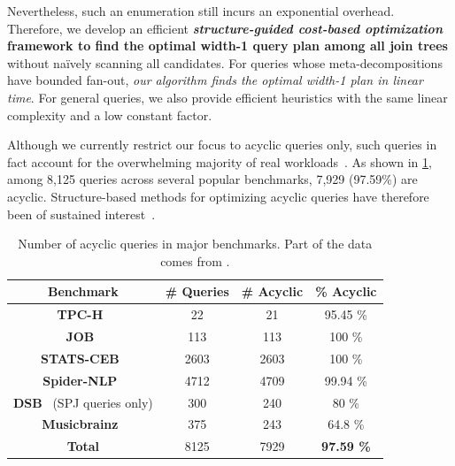 Nevertheless, such an enumeration still incurs an exponential overhead. Therefore, we develop an efficient \textbf{\emph{structure-guided cost-based optimization} framework to find the optimal width-1 query plan among all join trees} without na\"ively scanning all candidates. For queries whose meta-decompositions have bounded fan-out, \emph{our algorithm finds the optimal width-1 plan in linear time}. For general queries, we also provide efficient heuristics with the same linear complexity and a low constant factor.

Although we currently restrict our focus to acyclic queries only, such queries in fact account for the overwhelming majority of real workloads~\cite{DBLP:journals/vldb/BonifatiMT20,luo_algorithms_2025}. As shown in \cref{tab:acyclic-in-benchmarks}, among 8,125 queries across several popular benchmarks, 7,929 (97.59\%) are acyclic. Structure-based methods for optimizing acyclic queries have therefore been of sustained interest~\cite{yannakakis_algorithms_1981,wang_yannakakis_2025,RPT2025,yang_predicate_2024,bekkers2024instance,wang2023relational,SIGMOD22,DiamondJoin2024, SIGMOD23, luo_algorithms_2025}.
\begin{table}
    \small
    \centering
    \begin{footnotesize}
    \begin{tabular}{c|c|c|c}
        \hline
        {\bf Benchmark} & {\bf \# Queries} & {\bf \# Acyclic} & {\bf \% Acyclic} \\ \hline
        {\bf TPC-H}~\cite{noauthor_tpc_2022}              & 22         & 21 & 95.45 \%       \\ \hline
        {\bf JOB}~\cite{leis_query_2018} & 113 & 113 & 100 \% \\ \hline
        {\bf STATS-CEB}~\cite{han_cardinality_2021} & 2603 & 2603 & 100 \% \\ \hline
        {\bf Spider-NLP}~\cite{yu_spider_2018} & 4712 & 4709 & 99.94 \% \\ \hline
        {\bf DSB}~\cite{ding_dsb_2021} (SPJ queries only) & 300 & 240 & 80 \% \\ \hline
        {\bf Musicbrainz}~\cite{mancini_efficient_2022} & 375 & 243 & 64.8 \% \\ \hline
        {\bf Total} & 8125 & 7929 & {\bf 97.59 \%} \\ \hline
    \end{tabular}
    \end{footnotesize}
    \caption{Number of acyclic queries in major benchmarks. Part of the data comes from \cite{luo_algorithms_2025}.}
    \label{tab:acyclic-in-benchmarks}
    \vspace{-1\baselineskip}
\end{table}

